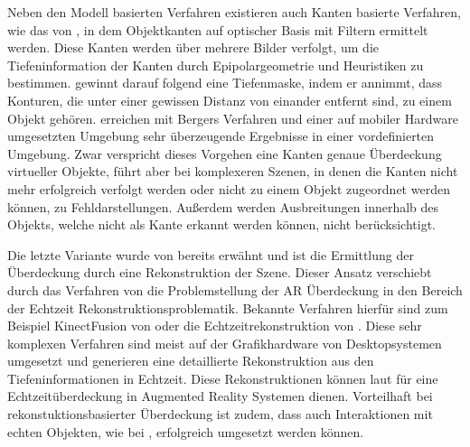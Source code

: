 Neben den Modell basierten Verfahren existieren auch Kanten basierte Verfahren, wie das von \citet{berger1997resolving}, in dem Objektkanten auf optischer Basis mit Filtern ermittelt werden. Diese Kanten werden über mehrere Bilder verfolgt, um die Tiefeninformation der Kanten durch Epipolargeometrie und Heuristiken zu bestimmen. \citet{berger1997resolving} gewinnt darauf folgend  eine Tiefenmaske, indem er annimmt, dass Konturen, die unter einer gewissen Distanz von einander entfernt sind, zu einem Objekt gehören. \citet{klein2004sensor} erreichen mit Bergers Verfahren und einer auf mobiler Hardware umgesetzten Umgebung sehr überzeugende Ergebnisse in einer vordefinierten Umgebung. Zwar verspricht dieses Vorgehen eine Kanten genaue Überdeckung virtueller Objekte, führt aber bei komplexeren Szenen, in denen die Kanten nicht mehr erfolgreich verfolgt werden oder nicht zu einem Objekt zugeordnet werden können, zu Fehldarstellungen. Außerdem werden Ausbreitungen innerhalb des Objekts, welche nicht als Kante erkannt werden können, nicht berücksichtigt.

Die letzte Variante wurde von \citet{breen1996interactive} bereits erwähnt und ist die Ermittlung der Überdeckung durch eine Rekonstruktion der Szene. Dieser Ansatz verschiebt durch das Verfahren von \citet{wloka1995resolving} die Problemstellung der AR Überdeckung in den Bereich der Echtzeit Rekonstruktionsproblematik. Bekannte Verfahren hierfür sind zum Beispiel KinectFusion von \citet{newcombe2011kinectfusion} oder die Echtzeitrekonstruktion von \citet{niessner2013real}. Diese sehr komplexen Verfahren sind meist auf der Grafikhardware von Desktopsystemen umgesetzt und generieren eine detaillierte Rekonstruktion aus den Tiefeninformationen in Echtzeit. Diese Rekonstruktionen können laut \citet{newcombe2011kinectfusion} für eine Echtzeitüberdeckung in Augmented Reality Systemen dienen. Vorteilhaft bei rekonstuktionsbasierter Überdeckung ist zudem, dass auch Interaktionen mit echten Objekten, wie bei \citet{breen1996interactive}, erfolgreich umgesetzt werden können.



